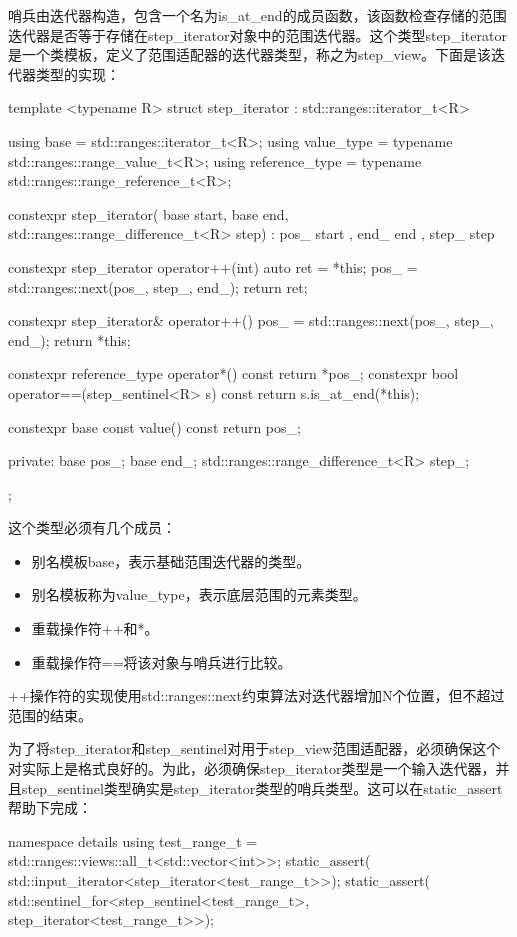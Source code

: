 哨兵由迭代器构造，包含一个名为is\_at\_end的成员函数，该函数检查存储的范围迭代器是否等于存储在step\_iterator对象中的范围迭代器。这个类型step\_iterator是一个类模板，定义了范围适配器的迭代器类型，称之为step\_view。下面是该迭代器类型的实现：

\begin{cpp}
template <typename R>
struct step_iterator : std::ranges::iterator_t<R>
{
	using base
		= std::ranges::iterator_t<R>;
	using value_type
		= typename std::ranges::range_value_t<R>;
	using reference_type
		= typename std::ranges::range_reference_t<R>;
		
	constexpr step_iterator(
		base start, base end,
		std::ranges::range_difference_t<R> step) :
		pos_{ start }, end_{ end }, step_{ step }
	{
	}

	constexpr step_iterator operator++(int)
	{
		auto ret = *this;
		pos_ = std::ranges::next(pos_, step_, end_);
		return ret;
	}

	constexpr step_iterator& operator++()
	{
		pos_ = std::ranges::next(pos_, step_, end_);
		return *this;
	}

	constexpr reference_type operator*() const
	{
		return *pos_;
	}
	constexpr bool operator==(step_sentinel<R> s) const
	{
		return s.is_at_end(*this);
	}

	constexpr base const value() const { return pos_; }
	
private:
	base pos_;
	base end_;
	std::ranges::range_difference_t<R> step_;
};
\end{cpp}

这个类型必须有几个成员：

\begin{itemize}
  \item 别名模板base，表示基础范围迭代器的类型。
  \item 别名模板称为value\_type，表示底层范围的元素类型。
  \item 重载操作符++和*。
  \item 重载操作符==将该对象与哨兵进行比较。
\end{itemize}

++操作符的实现使用std::ranges::next约束算法对迭代器增加N个位置，但不超过范围的结束。

为了将step\_iterator和step\_sentinel对用于step\_view范围适配器，必须确保这个对实际上是格式良好的。为此，必须确保step\_iterator类型是一个输入迭代器，并且step\_sentinel类型确实是step\_iterator类型的哨兵类型。这可以在static\_assert帮助下完成：

\begin{cpp}
namespace details
{
	using test_range_t =
		std::ranges::views::all_t<std::vector<int>>;
	static_assert(
		std::input_iterator<step_iterator<test_range_t>>);
	static_assert(
		std::sentinel_for<step_sentinel<test_range_t>,
		step_iterator<test_range_t>>);
}
\end{cpp}

